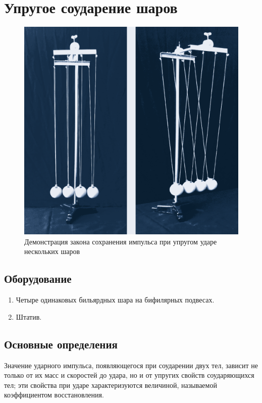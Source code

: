 \documentclass[All.tex]{subfiles}
\begin{document}


	\section{Упругое соударение шаров}


\begin{figure}[H]
	\centering 	
	\includegraphics[width=0.75\linewidth]{impact-1.png}
	\caption{Демонстрация закона сохранения импульса при упругом ударе нескольких шаров}
	\label{impact-1}
\end{figure}

\subsection*{\textcolor{PineGreen}{Оборудование}}

\begin{enumerate}
	\item Четыре одинаковых бильярдных шара на бифилярных подвесах.
	\item Штатив.
\end{enumerate}

\subsection*{\textcolor{PineGreen}{Основные определения}}

Значение ударного импульса, появляющегося при соударении двух тел, зависит не только от их масс и скоростей до удара, но и от упругих свойств соударяющихся тел; эти свойства при ударе характеризуются величиной, называемой коэффициентом восстановления.
\end{document}
